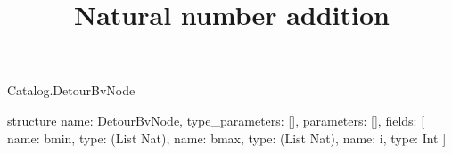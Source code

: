 \begin{lexlean}{Catalog.DetourBvNode}
\title{Natural number addition}
\begin{semanticmodule}
structure{
  name: DetourBvNode,
  type_parameters: [],
  parameters: [],
  fields: [
    {name: bmin, type: (List Nat)},
    {name: bmax, type: (List Nat)},
    {name: i, type: Int}
  ]
}
\end{semanticmodule}
\end{lexlean}
